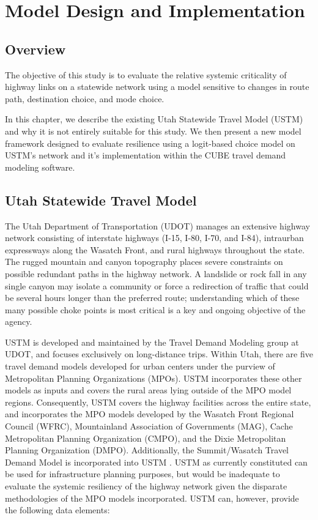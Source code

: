 \chapter{Model Design and Implementation}
\label{chp:chapter3}
\graphicspath{{figures/}{figures/chapter3/}}

\section{Overview} \label{Overview}

The objective of this study is to evaluate the relative systemic
criticality of highway links on a statewide network using a model
sensitive to changes in route path, destination choice, and mode choice.

In this chapter, we describe the existing Utah Statewide Travel Model (USTM) and why
it is not entirely suitable for this study. We then present a new model
framework designed to evaluate resilience using a logit-based choice model on
USTM's network and it's implementation within the CUBE travel demand
modeling software.

\section{Utah Statewide Travel Model} \label{Utah Statewide Travel Model}

The Utah Department of Transportation (UDOT) manages an extensive highway
network consisting of interstate highways (I-15, I-80, I-70, and I-84),
intraurban expressways along the Wasatch Front, and rural highways throughout
the state. The rugged mountain and canyon topography places
severe constraints on possible redundant paths in the highway network. A
landslide or rock fall in any single canyon may isolate a community or force a
redirection of traffic that could be several hours longer than the preferred
route; understanding which of these many possible choke points is most
critical is a key and ongoing objective of the agency.

USTM is developed and maintained by
the Travel Demand Modeling group at UDOT, and focuses exclusively on
long-distance trips. Within Utah, there are five travel
demand models developed for urban centers under the purview of  Metropolitan
Planning Organizations (MPOs). USTM incorporates these other models as inputs and covers
the rural areas lying outside of the MPO model regions. Consequently, USTM covers the
highway facilities across the entire state, and incorporates the MPO models
developed by the Wasatch Front Regional Council (WFRC), Mountainland
Association of Governments (MAG), Cache Metropolitan Planning Organization
(CMPO), and the Dixie Metropolitan Planning Organization (DMPO). Additionally,
the Summit/Wasatch Travel Demand Model is incorporated into USTM \citep{udot2021}.
USTM as currently
constituted can be used for infrastructure planning purposes, but would be
inadequate to evaluate the systemic resiliency of the highway network given
the disparate methodologies of the MPO models incorporated. USTM can, however, provide the
following data elements:

